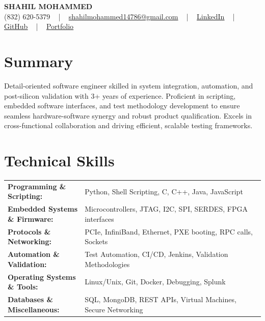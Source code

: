 \documentclass[letterpaper,11pt]{article}
\begin{document}
\begin{center}
    {\fontsize{14pt}{12pt}\selectfont \textbf{\MakeUppercase{Shahil Mohammed}}}\\ \vspace{2pt}
    \fontsize{10pt}{12pt}\selectfont (832) 620-5379 ~ | ~ \href{mailto:shahilmohammed14786@gmail.com}{shahilmohammed14786@gmail.com} ~ | ~  
    \href{https://www.linkedin.com/in/shahil-mohammed-9652931a1/}{\color{blue}\underline{LinkedIn}}  ~ | ~ 
    \href{https://github.com/freakbeast14}{\color{blue}\underline{GitHub}} ~ | ~ 
    \href{https://shahil-mohammed.netlify.app/}{\color{blue}\underline{Portfolio}}
    \vspace{-8pt}
\end{center}

\section{Summary}
\fontsize{9pt}{10pt}\selectfont
Detail-oriented software engineer skilled in system integration, automation, and post-silicon validation with 3+ years of experience. Proficient in scripting, embedded software interfaces, and test methodology development to ensure seamless hardware-software synergy and robust product qualification. Excels in cross-functional collaboration and driving efficient, scalable testing frameworks.
 \vspace{-5pt}
 
\section{Technical Skills}
        \vspace{-14pt}
        \begin{table}[h]
            \fontsize{9pt}{10pt}\selectfont
            \begin{tabular}{p{0.3\linewidth} p{0.7\linewidth}}
                \textbf{Programming \& Scripting:} & Python, Shell Scripting, C, C++, Java, JavaScript \\
                \textbf{Embedded Systems \& Firmware:} & Microcontrollers, JTAG, I2C, SPI, SERDES, FPGA interfaces \\
                \textbf{Protocols \& Networking:} & PCIe, InfiniBand, Ethernet, PXE booting, RPC calls, Sockets \\
                \textbf{Automation \& Validation:} & Test Automation, CI/CD, Jenkins, Validation Methodologies \\
                \textbf{Operating Systems \& Tools:} & Linux/Unix, Git, Docker, Debugging, Splunk \\
                \textbf{Databases \& Miscellaneous:} & SQL, MongoDB, REST APIs, Virtual Machines, Secure Networking \\
            \end{tabular}
        \end{table}
 \vspace{-15pt}
 
\end{document}
